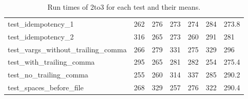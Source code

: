\begin{table}[h!]
\begin{tabular}{@{}l|p{5em}p{5em}p{5em}p{5em}p{5em}p{5em}@{}}
    test\_idempotency\_1                  & 262                  & 276                  & 273                  & 274                  & 284                  & 273.8                      \\
    test\_idempotency\_2                  & 316                  & 265                  & 273                  & 260                  & 291                  & 281                        \\
    test\_vargs\_without\_trailing\_comma & 266                  & 279                  & 331                  & 275                  & 329                  & 296                        \\
    test\_with\_trailing\_comma           & 295                  & 265                  & 281                  & 282                  & 254                  & 275.4                      \\
    test\_no\_trailing\_comma             & 255                  & 260                  & 314                  & 337                  & 285                  & 290.2                      \\ 
    test\_spaces\_before\_file            & 268                  & 329                  & 257                  & 276                  & 322                  & 290.4                     \\ \bottomrule
    \end{tabular}
    \caption{Run times of 2to3 for each test and their means.}
    \label{table:2to3-performance}
\end{table}

